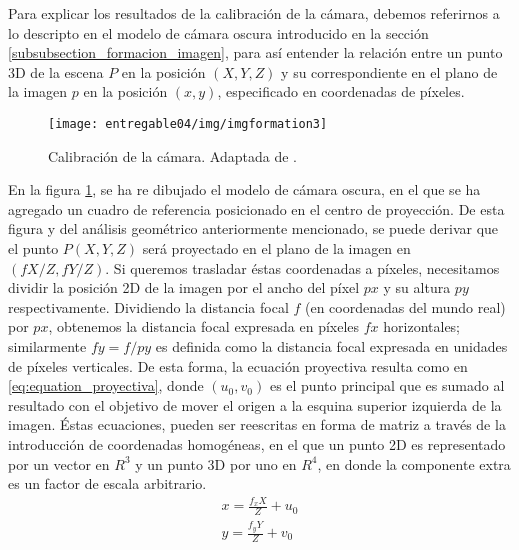 \documentclass[a4paper,11pt,spanish]{article}
\begin{document}
Para explicar los resultados de la calibración de la cámara, debemos referirnos a lo descripto en el modelo de cámara oscura introducido en la sección \ref{subsubsection_formacion_imagen}, para así entender la relación entre un punto 3D de la escena $P$ en la posición $(X,Y,Z)$ y su correspondiente en el plano de la imagen $p$ en la posición $(x,y)$, especificado en coordenadas de píxeles.

\begin{figure}[tbhp]
\centerline{\texttt{[image: entregable04/img/imgformation3]}}
\caption{Calibración de la cámara. Adaptada de \cite{citeulike:9456628}.}
\label{figura_image_formation_3}
\end{figure}

En la figura \ref{figura_image_formation_3}, se ha re dibujado el modelo de cámara oscura, en el que se ha agregado un cuadro de referencia posicionado en el centro de proyección. De esta figura y del análisis geométrico anteriormente mencionado, se puede derivar que el punto $P(X,Y,Z)$ será proyectado en el plano de la imagen en $(fX/Z, fY/Z)$. Si queremos trasladar éstas coordenadas a píxeles, necesitamos dividir la posición 2D de la imagen por el ancho del píxel $px$ y su altura $py$ respectivamente. Dividiendo la distancia focal $f$ (en coordenadas del mundo real) por $px$, obtenemos la distancia focal expresada en píxeles $fx$ horizontales; similarmente $fy=f/py$ es definida como la distancia focal expresada en unidades de píxeles verticales. De esta forma, la ecuación proyectiva resulta como en \eqref{eq:equation_proyectiva}, donde $(u_0, v_0)$ es el punto principal que es sumado al resultado con el objetivo de mover el origen a la esquina superior izquierda de la imagen. Éstas ecuaciones, pueden ser reescritas en forma de matriz a través de la introducción de coordenadas homogéneas, en el que un punto 2D es representado por un vector en $R^3$ y un punto 3D por uno en $R^4$, en donde la componente extra es un factor de escala arbitrario. %
\begin{eqnarray}
\label{eq:equation_proyectiva}
 x=\frac{f_x X}{Z}+u_0 \nonumber \\
 y=\frac{f_y Y}{Z}+v_0
\end{eqnarray}
\end{document}
